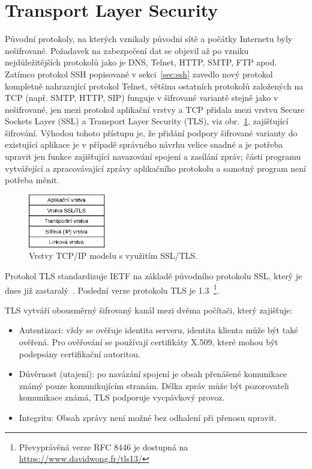 \section{Transport Layer Security}
\label{tls}

Původní protokoly, na kterých vznikaly původní sítě a počátky Internetu byly
nešifrované. Požadavek na zabezpečení dat se objevil až po vzniku
nejdůležitějších protokolů jako je DNS, Telnet, HTTP, SMTP, FTP apod. Zatímco
protokol SSH popisované v sekci~\ref{sec:ssh} zavedlo nový protokol kompletně
nahrazující protokol Telnet, většina ostatních protokolů založených na TCP
(např. SMTP, HTTP, SIP) funguje v šifrované variantě stejně jako v nešifrované,
jen mezi protokol aplikační vrstvy a TCP přidala mezi vrstvu Secure Sockets
Layer (SSL) a Transport Layer Security (TLS), viz obr.~\ref{fig:tls},
zajišťující šifrování. Výhodou tohoto přístupu je, že přidání podpory šifrované
varianty do existující aplikace je v případě správného návrhu velice snadné a je
potřeba upravit jen funkce zajišťující navazování spojení a zasílání zpráv;
části programu vytvářející a zpracovávající zprávy aplikačního protokolu a
samotný program není potřeba měnit.

\begin{figure}[h!]
  \centering
    \includegraphics[width=0.3\textwidth]{fig/vrstvy-ssl}
  \caption{Vrstvy TCP/IP modelu s využitím SSL/TLS.}
 \label{fig:tls}
\end{figure}

Protokol TLS standardizuje IETF na základě původního protokolu SSL, který je
dnes již zastaralý~\cite{RFC7568}. Poslední verze protokolu TLS je
1.3~\cite{RFC8446}\footnote{Převyprávěná verze RFC 8446 je dostupná na \url{https://www.davidwong.fr/tls13/}}.

TLS vytváří obousměrný šifrovaný kanál mezi dvěma počítači, který zajišťuje:

\begin{itemize}

  \item Autentizaci: vždy se ověřuje identita serveru, identita klienta může být
  také ověřená. Pro ověřování se používají certifikáty X.509, které mohou být
  podepsány certifikační autoritou.

  \item Důvěrnost (utajení): po navázání spojení je obsah přenášené komunikace
  známý pouze komunikujícím stranám. Délka zpráv může být pozorovateli
  komunikace známá, TLS podporuje vycpávkový provoz.

  \item Integritu: Obsah zprávy není možné bez odhalení při přenosu upravit.

\end{itemize}

